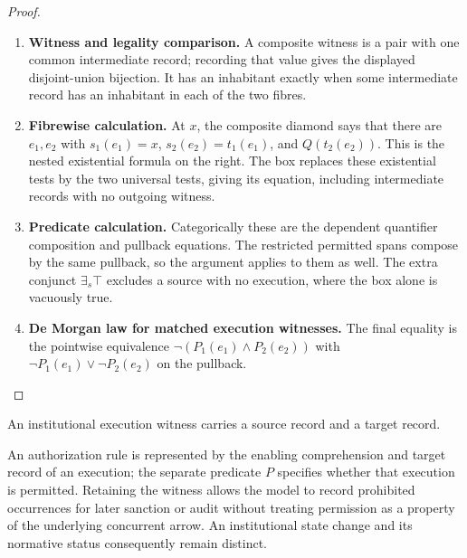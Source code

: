 \documentclass[11pt,a4paper]{article}
\numberwithin{equation}{section}
\theoremstyle{definition}
\theoremstyle{remark}
\theoremstyle{plain}
\begin{document}
\begin{proof}
\leavevmode
\begin{enumerate}[label=\textup{(\arabic*)},leftmargin=*,itemsep=4pt,topsep=3pt]
  \item \textbf{Witness and legality comparison.} A composite witness is a pair with one common intermediate record;
recording that value gives the displayed disjoint-union bijection. It has an inhabitant exactly when some intermediate record has
an inhabitant in each of the two fibres.
  \item \textbf{Fibrewise calculation.} At $x$, the composite diamond says that there are $e_1,e_2$
with $s_1(e_1)=x$, $s_2(e_2)=t_1(e_1)$, and $Q(t_2(e_2))$. This is the nested existential formula on the right. The box
replaces these existential tests by the two universal tests,
giving its equation, including intermediate records with no
outgoing witness.
  \item \textbf{Predicate calculation.} Categorically these are the dependent
quantifier composition and pullback equations. The restricted
permitted spans compose by the same pullback, so the argument
applies to them as well. The extra conjunct $\exists_s\top$
excludes a source with no execution, where the box alone is
vacuously true.
  \item \textbf{De Morgan law for matched execution witnesses.} The final equality is the pointwise equivalence
$\neg(P_1(e_1)\wedge P_2(e_2))$ with
$\neg P_1(e_1)\vee\neg P_2(e_2)$ on the pullback.
\end{enumerate}
\end{proof}

\noindent An institutional execution witness carries a source record and a target record.
\begin{center}
\end{center}

An authorization rule is represented by the enabling
comprehension and target record of an execution; the separate predicate
$P$ specifies whether that execution is permitted. Retaining the
witness allows the model to record prohibited occurrences for later
sanction or audit without treating permission as a property of the
underlying concurrent arrow. An institutional state change and its
normative status consequently remain distinct.
\end{document}
